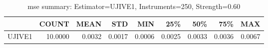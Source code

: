 \begin{table}[ht]
\centering
\caption{mse summary: Estimator=UJIVE1, Instruments=250, Strength=0.60}
\begin{tabular}{lrrrrrrrr}
\toprule
 & COUNT & MEAN & STD & MIN & 25\% & 50\% & 75\% & MAX \\
\midrule
UJIVE1 & 10.0000 & 0.0032 & 0.0017 & 0.0006 & 0.0025 & 0.0033 & 0.0036 & 0.0067 \\
\bottomrule
\end{tabular}
\end{table}
